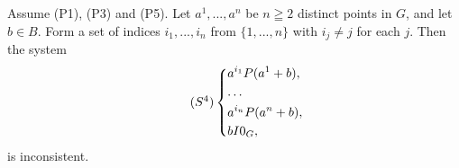 \documentclass[10pt,a4paper]{amsart}
\begin{document}
\begin{proposition}
\label{prop4}
Assume (P1), (P3) and (P5). Let $a^1, ..., a^n$ be $n \geqq 2$ distinct points in $G$, and let $b \in B$. Form a set of indices $i_1, ..., i_n$ from $\{1, ..., n\}$ with $i_j \neq j$ for each $j$. Then the system
\begin{equation}
\tag{$S^{4}$}
\label{$S^{4}$}
  \left\{
    \begin{aligned}
      & a^{i_1}P(a^{1} + b), \\
      & \dots \\
      & a^{i_{n}}P(a^{n} + b), \\
      & bI{0_G},
    \end{aligned}
  \right.
\end{equation}
is inconsistent.
\end{proposition}
\end{document}
